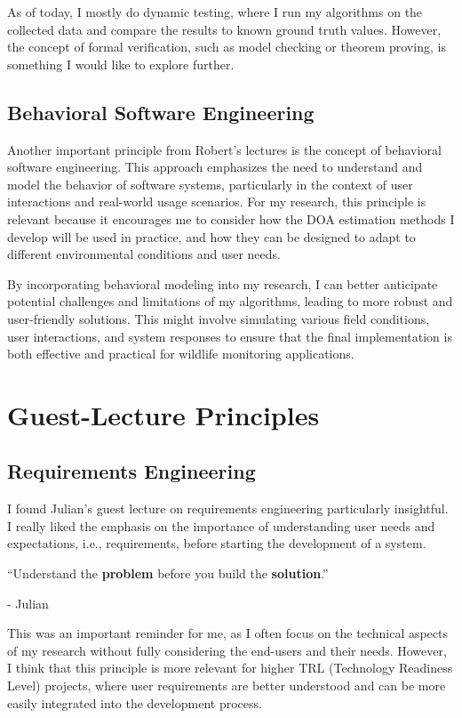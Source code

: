 \documentclass[a4paper,11pt]{article}
\begin{document}
As of today, I mostly do dynamic testing, where I run my algorithms on the collected data and compare the results to known ground truth values. However, the concept of formal verification, such as model checking or theorem proving, is something I would like to explore further.

\subsection{Behavioral Software Engineering}
Another important principle from Robert's lectures is the concept of behavioral software engineering. This approach emphasizes the need to understand and model the behavior of software systems, particularly in the context of user interactions and real-world usage scenarios. For my research, this principle is relevant because it encourages me to consider how the DOA estimation methods I develop will be used in practice, and how they can be designed to adapt to different environmental conditions and user needs.

By incorporating behavioral modeling into my research, I can better anticipate potential challenges and limitations of my algorithms, leading to more robust and user-friendly solutions. This might involve simulating various field conditions, user interactions, and system responses to ensure that the final implementation is both effective and practical for wildlife monitoring applications.

\section{Guest-Lecture Principles}
\subsection{Requirements Engineering}
I found Julian's guest lecture on requirements engineering particularly insightful.
I really liked the emphasis on the importance of understanding user needs and expectations, i.e., requirements, before starting the development of a system. 
\begin{displayquote}
``Understand the \textbf{problem} before you build the \textbf{solution}.'' \\ \begin{flushright}- Julian
\end{flushright}\end{displayquote}
This was an important reminder for me, as I often focus on the technical aspects of my research without fully considering the end-users and their needs.
However, I think that this principle is more relevant for higher TRL (Technology Readiness Level) projects, where user requirements are better understood and can be more easily integrated into the development process.
\end{document}
